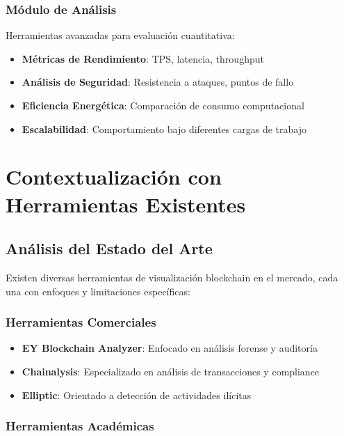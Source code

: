 \subsubsection{Módulo de Análisis}

Herramientas avanzadas para evaluación cuantitativa:

\begin{itemize}
    \item \textbf{Métricas de Rendimiento}: TPS, latencia, throughput
    \item \textbf{Análisis de Seguridad}: Resistencia a ataques, puntos de fallo
    \item \textbf{Eficiencia Energética}: Comparación de consumo computacional
    \item \textbf{Escalabilidad}: Comportamiento bajo diferentes cargas de trabajo
\end{itemize}

\section{Contextualización con Herramientas Existentes}

\subsection{Análisis del Estado del Arte}

Existen diversas herramientas de visualización blockchain en el mercado, cada una con enfoques y limitaciones específicas:

\subsubsection{Herramientas Comerciales}

\begin{itemize}
    \item \textbf{EY Blockchain Analyzer}: Enfocado en análisis forense y auditoría
    \item \textbf{Chainalysis}: Especializado en análisis de transacciones y compliance
    \item \textbf{Elliptic}: Orientado a detección de actividades ilícitas
\end{itemize}

\subsubsection{Herramientas Académicas}

